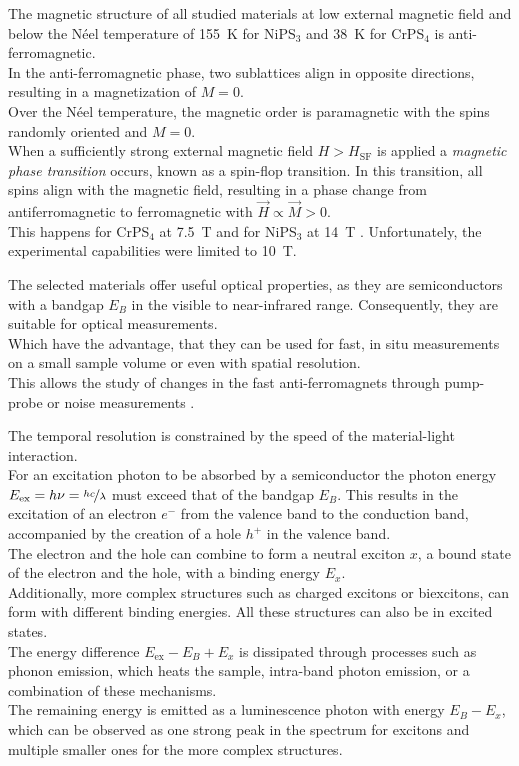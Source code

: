 \documentclass[
	oneside,
	parskip=half,
	a4paper,
]{scrbook}
\begin{document}
The magnetic structure of all studied materials at low external magnetic field and below the Néel temperature of \SI{155}{K} for NiPS$_3$ and \SI{38}{K} for CrPS$_4$ \cite{MPS_magnetism, CrPS4_magnetic}  is anti-ferromagnetic.\\
In the anti-ferromagnetic phase, two sublattices align in opposite directions, resulting in a magnetization of $M=0$.\\
Over the Néel temperature, the magnetic order is paramagnetic with the spins randomly oriented and $M=0$.\\
When a sufficiently strong external magnetic field $H>H_\text{SF}$ is applied a \textit{magnetic phase transition} occurs, known as a spin-flop transition.
In this transition, all spins align with the magnetic field, resulting in a phase change from antiferromagnetic to ferromagnetic with $\vec{H}\propto \vec{M}>0$.\\
This happens for CrPS$_4$ at \SI{7.5}{T} \cite{CrPS4_magnetic} and for NiPS$_3$ at \SI{14}{T} \cite{NiPS3_magnon_gap}.
Unfortunately, the experimental capabilities were limited to \SI{10}{T}.

The selected materials offer useful optical properties, as they are semiconductors with a bandgap $E_B$ in the visible to near-infrared range.
Consequently, they are suitable for optical measurements.\\
Which have the advantage, that they can be used for fast, in situ measurements on a small sample volume or even with spatial resolution.\\
This allows the study of changes in the fast anti-ferromagnets through pump-probe or noise measurements \cite{AFM_review}.

The temporal resolution is constrained by the speed of the material-light interaction.\\
For an excitation photon to be absorbed by a semiconductor the photon energy $E_\text{ex} =h\nu= \nicefrac{hc}{\lambda}$ must exceed that of the bandgap $E_B$.
This results in the excitation of an electron $e^-$ from the valence band to the conduction band, accompanied by the creation of a hole $h^+$ in the valence band.\\
The electron and the hole can combine to form a neutral exciton $x$, a bound state of the electron and the hole, with a binding energy $E_x$.\\
Additionally, more complex structures such as charged excitons or biexcitons, can form with different binding energies.
All these structures can also be in excited states.\\
The energy difference $E_\text{ex}-E_B+E_x$ is dissipated through processes such as phonon emission, which heats the sample, intra-band photon emission, or a combination of these mechanisms.\\
The remaining energy is emitted as a luminescence photon with energy $E_B - E_x$, which can be observed as one strong peak in the spectrum for excitons and multiple smaller ones for the more complex structures.
\cite{MPX_first_principles,NiPS3_anisotropic,NiPS3_coherent,NiPS3_exciton}
\end{document}
